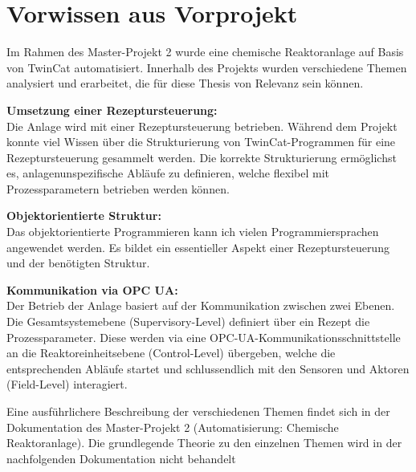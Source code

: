\section{Vorwissen aus Vorprojekt} \label{Vorwissen aus Vorprojekt}
	Im Rahmen des Master-Projekt 2 wurde eine chemische Reaktoranlage auf Basis von TwinCat automatisiert. Innerhalb des Projekts wurden verschiedene Themen analysiert und erarbeitet, die für diese Thesis von Relevanz sein können.
	\vspace{3mm}
	
	\textbf{Umsetzung einer Rezeptursteuerung:} \vspace{2mm} 
	\\
	Die Anlage wird mit einer Rezeptursteuerung betrieben. Während dem Projekt konnte viel Wissen über die Strukturierung von TwinCat-Programmen für eine Rezeptursteuerung gesammelt werden. Die korrekte Strukturierung ermöglichst es, anlagenunspezifische Abläufe zu definieren, welche flexibel mit Prozessparametern betrieben werden können. 
	\vspace{3mm}
	
	\textbf{Objektorientierte Struktur:} \vspace{2mm} 
	\\
	Das objektorientierte Programmieren kann ich vielen Programmiersprachen angewendet werden. Es bildet ein essentieller Aspekt einer Rezeptursteuerung und der benötigten Struktur.
	\vspace{3mm}
	
	\textbf{Kommunikation via OPC UA:} \vspace{2mm} 
	\\
	Der Betrieb der Anlage basiert auf der Kommunikation zwischen zwei Ebenen. Die Gesamtsystemebene (Supervisory-Level) definiert über ein Rezept die Prozessparameter. Diese werden via eine OPC-UA-Kommunikationsschnittstelle an die Reaktoreinheitsebene (Control-Level) übergeben, welche die entsprechenden Abläufe startet und schlussendlich mit den Sensoren und Aktoren (Field-Level) interagiert. 
	\vspace{3mm}
	
	Eine ausführlichere Beschreibung der verschiedenen Themen findet sich in der Dokumentation des Master-Projekt 2 (Automatisierung: Chemische Reaktoranlage). Die grundlegende Theorie zu den einzelnen Themen wird in der nachfolgenden Dokumentation  nicht behandelt
	
